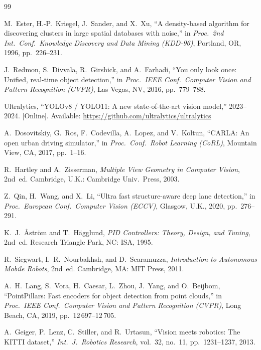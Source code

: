 \documentclass[12pt,a4paper]{article}
\begin{document}
\newpage

\begin{thebibliography}{99}

M.~Ester, H.-P.~Kriegel, J.~Sander, and X.~Xu,
``A density-based algorithm for discovering clusters in large spatial
databases with noise,''
in \textit{Proc.\ 2nd Int.\ Conf.\ Knowledge Discovery and Data Mining
(KDD-96)}, Portland, OR, 1996, pp.~226--231.

J.~Redmon, S.~Divvala, R.~Girshick, and A.~Farhadi,
``You only look once: Unified, real-time object detection,''
in \textit{Proc.\ IEEE Conf.\ Computer Vision and Pattern Recognition
(CVPR)}, Las Vegas, NV, 2016, pp.~779--788.

Ultralytics,
``YOLOv8 / YOLO11: A new state-of-the-art vision model,''
2023--2024. [Online].
Available: \url{https://github.com/ultralytics/ultralytics}

A.~Dosovitskiy, G.~Ros, F.~Codevilla, A.~Lopez, and V.~Koltun,
``CARLA: An open urban driving simulator,''
in \textit{Proc.\ Conf.\ Robot Learning (CoRL)}, Mountain View, CA,
2017, pp.~1--16.

R.~Hartley and A.~Zisserman,
\textit{Multiple View Geometry in Computer Vision}, 2nd~ed.
Cambridge, U.K.: Cambridge Univ.\ Press, 2003.

Z.~Qin, H.~Wang, and X.~Li,
``Ultra fast structure-aware deep lane detection,''
in \textit{Proc.\ European Conf.\ Computer Vision (ECCV)},
Glasgow, U.K., 2020, pp.~276--291.

K.~J.~\r{A}str\"{o}m and T.~H\"{a}gglund,
\textit{PID Controllers: Theory, Design, and Tuning}, 2nd~ed.
Research Triangle Park, NC: ISA, 1995.

R.~Siegwart, I.~R.~Nourbakhsh, and D.~Scaramuzza,
\textit{Introduction to Autonomous Mobile Robots}, 2nd~ed.
Cambridge, MA: MIT Press, 2011.

A.~H.~Lang, S.~Vora, H.~Caesar, L.~Zhou, J.~Yang, and O.~Beijbom,
``PointPillars: Fast encoders for object detection from point clouds,''
in \textit{Proc.\ IEEE Conf.\ Computer Vision and Pattern Recognition
(CVPR)}, Long Beach, CA, 2019, pp.~12\,697--12\,705.

A.~Geiger, P.~Lenz, C.~Stiller, and R.~Urtasun,
``Vision meets robotics: The KITTI dataset,''
\textit{Int.\ J.\ Robotics Research}, vol.~32, no.~11,
pp.~1231--1237, 2013.


\end{thebibliography}
\end{document}
